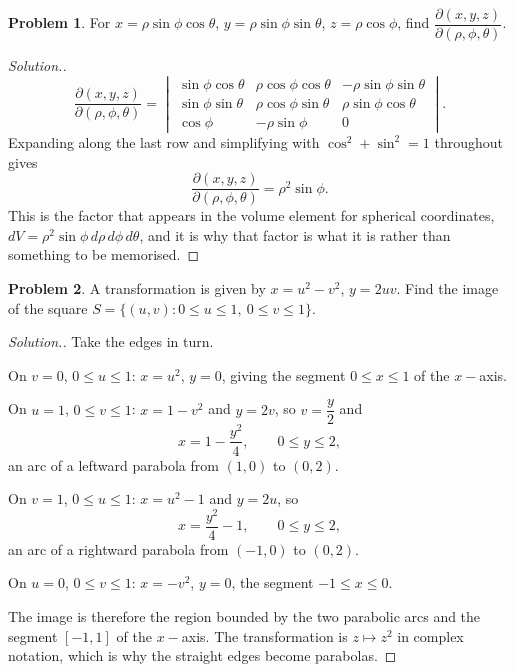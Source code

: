 \documentclass[11pt,a4paper]{article}
\theoremstyle{definition}
\newtheorem{problemx}{Problem}[subsection]
\newenvironment{problem}{\begin{problemx}}{\end{problemx}}
\newenvironment{solution}
  {\renewcommand{\qedsymbol}{}\begin{proof}[\textit{Solution}.]}
  {\end{proof}}
\begin{document}
\begin{problem}
For $x = \rho\sin\phi\cos\theta$, $y = \rho\sin\phi\sin\theta$,
$z = \rho\cos\phi$, find
$\dfrac{\partial(x,y,z)}{\partial(\rho,\phi,\theta)}$.
\end{problem}
\begin{solution}
\[\frac{\partial(x,y,z)}{\partial(\rho,\phi,\theta)}
= \begin{vmatrix}
\sin\phi\cos\theta & \rho\cos\phi\cos\theta & -\rho\sin\phi\sin\theta\\
\sin\phi\sin\theta & \rho\cos\phi\sin\theta & \rho\sin\phi\cos\theta\\
\cos\phi & -\rho\sin\phi & 0
\end{vmatrix}.\]
Expanding along the last row and simplifying with
$\cos^2+\sin^2 = 1$ throughout gives
\[\frac{\partial(x,y,z)}{\partial(\rho,\phi,\theta)} = \rho^2\sin\phi .\]
This is the factor that appears in the volume element for spherical
coordinates, $dV = \rho^2\sin\phi\,d\rho\,d\phi\,d\theta$, and it is why that
factor is what it is rather than something to be memorised.
\end{solution}

\begin{problem}
A transformation is given by $x = u^2-v^2$, $y = 2uv$. Find the image of the
square $S = \{(u,v): 0\leq u\leq 1,\ 0\leq v\leq 1\}$.
\end{problem}
\begin{solution}
Take the edges in turn.

On $v=0$, $0\leq u\leq 1$: $x = u^2$, $y = 0$, giving the segment
$0\leq x\leq 1$ of the $x-$axis.

On $u=1$, $0\leq v\leq 1$: $x = 1-v^2$ and $y = 2v$, so $v = \dfrac y2$ and
\[x = 1-\frac{y^2}{4},\qquad 0\leq y\leq 2 ,\]
an arc of a leftward parabola from $(1,0)$ to $(0,2)$.

On $v=1$, $0\leq u\leq 1$: $x = u^2-1$ and $y = 2u$, so
\[x = \frac{y^2}{4}-1,\qquad 0\leq y\leq 2 ,\]
an arc of a rightward parabola from $(-1,0)$ to $(0,2)$.

On $u=0$, $0\leq v\leq 1$: $x = -v^2$, $y = 0$, the segment $-1\leq x\leq 0$.

The image is therefore the region bounded by the two parabolic arcs and the
segment $[-1,1]$ of the $x-$axis. The transformation is $z\mapsto z^2$ in
complex notation, which is why the straight edges become parabolas.
\end{solution}
\end{document}
